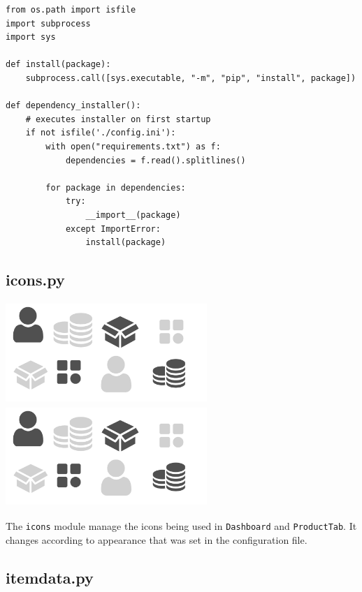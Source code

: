 \documentclass[12pt,a4paper]{article}
\renewcommand{\indent}{\hspace\parindent}
\begin{document}
            \begin{lstlisting}
from os.path import isfile
import subprocess
import sys

def install(package):
    subprocess.call([sys.executable, "-m", "pip", "install", package])

def dependency_installer():
    # executes installer on first startup
    if not isfile('./config.ini'):
        with open("requirements.txt") as f:
            dependencies = f.read().splitlines()

        for package in dependencies:
            try:
                __import__(package)
            except ImportError:
                install(package)
            \end{lstlisting}

        \subsection*{\normalfont{\faCode{}} \textbf{icons.py}}

            \begin{center}
                \includegraphics[width=3in,height=1.5in]{iconss.png}
                \includegraphics[width=3in,height=1.5in]{iconss.png}
            \end{center}

            \indent The \texttt{icons} module manage the icons being used in 
            \texttt{Dashboard} and \texttt{ProductTab}. It changes according 
            to appearance that was set in the configuration file.


        \subsection*{\normalfont{\faCode{}} \textbf{itemdata.py}}
\end{document}
